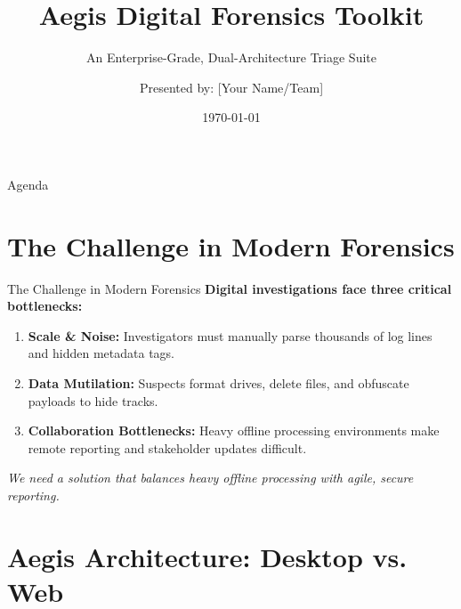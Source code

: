 \documentclass[aspectratio=169]{beamer}
\title{Aegis Digital Forensics Toolkit}
\subtitle{An Enterprise-Grade, Dual-Architecture Triage Suite}
\date{\today}
\author{Presented by: [Your Name/Team]}
\institute{Department of Cybersecurity \& Software Engineering}
\begin{document}
\begin{frame}
    \titlepage
\end{frame}

\begin{frame}{Agenda}
    \tableofcontents
\end{frame}

\section{The Challenge in Modern Forensics}

\begin{frame}{The Challenge in Modern Forensics}
    \textbf{Digital investigations face three critical bottlenecks:}
    \vspace{0.5cm}
    \begin{enumerate}
        \item \textbf{Scale \& Noise:} Investigators must manually parse thousands of log lines and hidden metadata tags.
        \item \textbf{Data Mutilation:} Suspects format drives, delete files, and obfuscate payloads to hide tracks.
        \item \textbf{Collaboration Bottlenecks:} Heavy offline processing environments make remote reporting and stakeholder updates difficult.
    \end{enumerate}
    \vspace{0.5cm}
    \textit{We need a solution that balances heavy offline processing with agile, secure reporting.}
\end{frame}

\section{Aegis Architecture: Desktop vs. Web}
\end{document}
